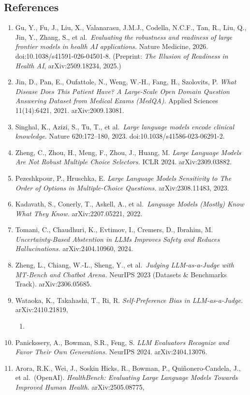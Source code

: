 \documentclass[
  11pt,
]{article}
\providecommand{\tightlist}{%
  \setlength{\itemsep}{0pt}\setlength{\parskip}{0pt}}
\begin{document}
\subsection{References}\label{references}

\begin{enumerate}
\def\labelenumi{\arabic{enumi}.}
\tightlist
\item
  Gu, Y., Fu, J., Liu, X., Valanarasu, J.M.J., Codella, N.C.F., Tan, R.,
  Liu, Q., Jin, Y., Zhang, S., et al.~\emph{Evaluating the robustness
  and readiness of large frontier models in health AI applications.}
  Nature Medicine, 2026. doi:10.1038/s41591-026-04501-8. (Preprint:
  \emph{The Illusion of Readiness in Health AI}, arXiv:2509.18234,
  2025.)
\item
  Jin, D., Pan, E., Oufattole, N., Weng, W.-H., Fang, H., Szolovits, P.
  \emph{What Disease Does This Patient Have? A Large-Scale Open Domain
  Question Answering Dataset from Medical Exams (MedQA).} Applied
  Sciences 11(14):6421, 2021. arXiv:2009.13081.
\item
  Singhal, K., Azizi, S., Tu, T., et al.~\emph{Large language models
  encode clinical knowledge.} Nature 620:172--180, 2023.
  doi:10.1038/s41586-023-06291-2.
\item
  Zheng, C., Zhou, H., Meng, F., Zhou, J., Huang, M. \emph{Large
  Language Models Are Not Robust Multiple Choice Selectors.} ICLR 2024.
  arXiv:2309.03882.
\item
  Pezeshkpour, P., Hruschka, E. \emph{Large Language Models Sensitivity
  to The Order of Options in Multiple-Choice Questions.}
  arXiv:2308.11483, 2023.
\item
  Kadavath, S., Conerly, T., Askell, A., et al.~\emph{Language Models
  (Mostly) Know What They Know.} arXiv:2207.05221, 2022.
\item
  Tomani, C., Chaudhuri, K., Evtimov, I., Cremers, D., Ibrahim, M.
  \emph{Uncertainty-Based Abstention in LLMs Improves Safety and Reduces
  Hallucinations.} arXiv:2404.10960, 2024.
\item
  Zheng, L., Chiang, W.-L., Sheng, Y., et al.~\emph{Judging
  LLM-as-a-Judge with MT-Bench and Chatbot Arena.} NeurIPS 2023
  (Datasets \& Benchmarks Track). arXiv:2306.05685.
\item
  Wataoka, K., Takahashi, T., Ri, R. \emph{Self-Preference Bias in
  LLM-as-a-Judge.} arXiv:2410.21819,

  \begin{enumerate}
  \def\labelenumii{\arabic{enumii}.}
  \setcounter{enumii}{2023}
  \tightlist
  \item
  \end{enumerate}
\item
  Panickssery, A., Bowman, S.R., Feng, S. \emph{LLM Evaluators Recognize
  and Favor Their Own Generations.} NeurIPS 2024. arXiv:2404.13076.
\item
  Arora, R.K., Wei, J., Soskin Hicks, R., Bowman, P., Quiñonero-Candela,
  J., et al.~(OpenAI). \emph{HealthBench: Evaluating Large Language
  Models Towards Improved Human Health.} arXiv:2505.08775,


\end{enumerate}
\end{document}
